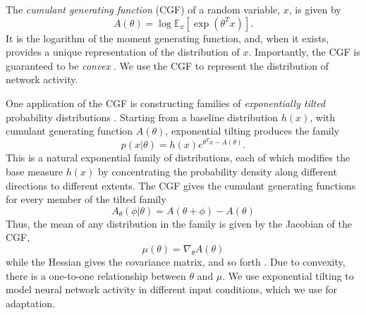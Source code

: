 \documentclass{article}      %
\begin{document}
The \textit{cumulant generating function} (CGF) of a random variable, $x$, is given by
\begin{equation}
  A(\theta) = \log \mathbb{E}_x[\exp(\theta^T x)]. \label{def:cgf}
\end{equation}
It is the logarithm of the moment generating function, and, when it exists, provides a unique representation of the distribution of $x$.
Importantly, the CGF is guaranteed to be \textit{convex} \cite{barndorff2014information}.
We use the CGF to represent the distribution of network activity. 

One application of the CGF is constructing families of \textit{exponentially tilted} probability distributions \cite{morris_natural_1982,morris_unifying_2009}.
Starting from a baseline distribution $h(x)$, with cumulant generating function $A(\theta)$, exponential tilting produces the family
\begin{equation}
  p(x | \theta) = h(x) e^{\theta^T x - A(\theta)}. \label{def:exponential_tilt}
\end{equation}
This is a natural exponential family of distributions, each of which modifies the base measure $h(x)$ by concentrating the probability density along different directions to different extents.
The CGF gives the cumulant generating functions for every member of the tilted family
\begin{equation}
  A_\theta(\phi | \theta) = A(\theta + \phi) - A(\theta) \label{eq:CGF_family}
\end{equation}
Thus, the mean of any distribution in the family is given by the Jacobian of the CGF,
\begin{equation}
  \mu(\theta) = \nabla_\theta A(\theta) \label{eq:cgf_jacobian}
\end{equation}
while the Hessian gives the covariance matrix, and so forth \cite{barndorff2014information}.
Due to convexity, there is a one-to-one relationship between $\theta$ and $\mu$.
We use exponential tilting to model neural network activity in different input conditions, which we use for adaptation.
\end{document}
